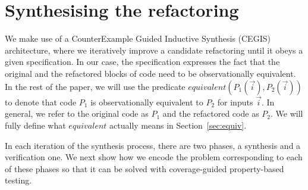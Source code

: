\documentclass[sigconf,review,anonymous]{acmart}
\begin{document}



 
\section{Synthesising the refactoring}\label{sec:encoding}

We make use of a CounterExample Guided Inductive Synthesis (CEGIS)~\cite{DBLP:conf/pldi/Solar-LezamaJB08} architecture, where we
iteratively improve a candidate refactoring until it obeys a given specification.
In our case, the specification expresses the fact that the original and
the refactored blocks of code need to be observationally equivalent.
%
In the rest of the paper, we will use the predicate
$equivalent(P_1(\vec{i}), P_2(\vec{i}))$ to denote that code $P_1$ is
observationally equivalent to $P_2$ for inputs $\vec{i}$.  In general,
we refer to the original code as $P_1$ and the refactored code as
$P_2$. We will fully define what $equivalent$ actually means in Section~\ref{sec:equiv}.


In each iteration of the synthesis process, there are two phases, a synthesis and a verification one. We next show how we encode the problem corresponding to each of these phases so that it can be solved with coverage-guided property-based testing.
\end{document}
